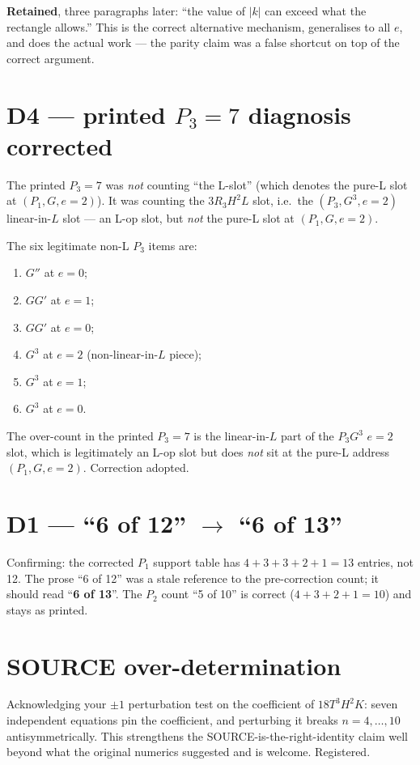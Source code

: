\documentclass[11pt]{article}
\begin{document}
\textbf{Retained}, three paragraphs later: ``the value of $|k|$ can
exceed what the rectangle allows.'' This is the correct alternative
mechanism, generalises to all $e$, and does the actual work — the
parity claim was a false shortcut on top of the correct argument.

\section{D4 — printed $P_3 = 7$ diagnosis corrected}

The printed $P_3 = 7$ was \emph{not} counting ``the L-slot'' (which
denotes the pure-L slot at $(P_1, G, e = 2)$). It was counting the
$3 R_3 H^2 L$ slot, i.e.\ the $(P_3, G^3, e = 2)$ linear-in-$L$ slot —
an L-op slot, but \emph{not} the pure-L slot at $(P_1, G, e = 2)$.

The six legitimate non-L $P_3$ items are:
\begin{enumerate}[label=(\alph*), leftmargin=2em, itemsep=0pt]
  \item $G''$ at $e = 0$;
  \item $G G'$ at $e = 1$;
  \item $G G'$ at $e = 0$;
  \item $G^3$ at $e = 2$ (non-linear-in-$L$ piece);
  \item $G^3$ at $e = 1$;
  \item $G^3$ at $e = 0$.
\end{enumerate}
The over-count in the printed $P_3 = 7$ is the linear-in-$L$ part of
the $P_3 G^3$ $e = 2$ slot, which is legitimately an L-op slot but
does \emph{not} sit at the pure-L address $(P_1, G, e = 2)$.
Correction adopted.

\section{D1 — ``6 of 12'' $\to$ ``6 of 13''}

Confirming: the corrected $P_1$ support table has
$4 + 3 + 3 + 2 + 1 = 13$ entries, not 12. The prose ``6 of 12'' was a
stale reference to the pre-correction count; it should read
``\textbf{6 of 13}''. The $P_2$ count ``5 of 10'' is correct
($4 + 3 + 2 + 1 = 10$) and stays as printed.

\section{SOURCE over-determination}

Acknowledging your $\pm 1$ perturbation test on the coefficient of
$18 T^3 H^2 K$: seven independent equations pin the coefficient, and
perturbing it breaks $n = 4, \dots, 10$ antisymmetrically. This
strengthens the SOURCE-is-the-right-identity claim well beyond what
the original numerics suggested and is welcome. Registered.
\end{document}
